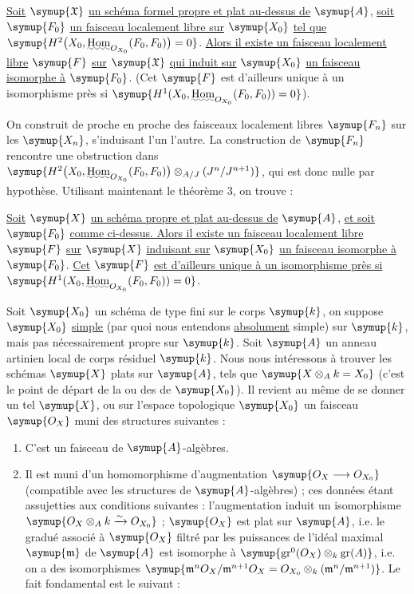  \uline{Soit} $\symup{\mathfrak X}$ \uline{un schéma formel propre et plat
au-dessus de} $\symup{A}$, \uline{soit} $\symup{F_0}$ \uline{un faisceau localement libre sur} $\symup{X_0}$ \uline{tel que}
$\symup{H^2\bigl(X_0,\mathop{\text{\uwave{Hom}}}\nolimits_{O_{X_0}}(F_0,F_0)\bigr)=0}$.
\uline{Alors il existe un faisceau localement libre} $\symup{F}$ \uline{sur} $\symup{\mathfrak X}$ \uline{qui induit
sur} $\symup{X_0}$ \uline{un faisceau isomorphe à} $\symup{F_0}$. (Cet $\symup{F}$ est d'ailleurs unique à un
isomorphisme près si
$\symup{H^1(X_0,\mathop{\text{\uwave{Hom}}}\nolimits_{O_{X_0}}(F_0,F_0))=0}$).

On construit de proche en proche des faisceaux localement libres $\symup{F_n}$ sur les
$\symup{X_n}$, s'induisant l'un l'autre. La construction de $\symup{F_n}$ rencontre une
obstruction dans
$\symup{H^2\bigl(X_0,\mathop{\text{\uwave{Hom}}}\nolimits_{O_{X_0}}(F_0,F_0)\bigr) \otimes_{A/J}(J^n/J^{n+1})}$,
qui est donc nulle par hypothèse. Utilisant maintenant le théorème 3, on
trouve :

 \uline{Soit} $\symup{X}$ \uline{un schéma propre et plat au-dessus de} $\symup{A}$, \uline{et
soit} $\symup{F_0}$ \uline{comme ci-dessus. Alors il existe un faisceau localement libre} $\symup{F}$
\uline{sur} $\symup{X}$ \uline{induisant sur} $\symup{X_0}$ \uline{un faisceau isomorphe à} $\symup{F_0}$. \uline{Cet} $\symup{F}$ \uline{est
d'ailleurs unique à un isomorphisme près si}
$\symup{H^1(X_0,\mathop{\text{\uwave{Hom}}}\nolimits_{O_{X_0}}(F_0,F_0))=0}$.

Soit $\symup{X_0}$ un schéma de type fini sur le corps $\symup{k}$, on suppose $\symup{X_0}$ \uline{simple}
(par quoi nous entendons \uline{absolument} simple) sur $\symup{k}$, mais pas nécessairement
propre sur $\symup{k}$. Soit $\symup{A}$ un anneau artinien local de corps résiduel $\symup{k}$. Nous
nous intéressons à trouver les schémas $\symup{X}$ plats sur $\symup{A}$, tels que
$\symup{X\otimes_A k=X_0}$ (c'est le point de départ de la  ou
des  de $\symup{X_0}$). Il revient au même de se donner un
tel $\symup{X}$, ou sur l'espace topologique $\symup{X_0}$ un faisceau $\symup{O_X}$ muni des
structures suivantes :
\begin{enumerate}
  \item[\textnormal{i.}] C'est un faisceau de $\symup{A}$-algèbres.
  \item[\textnormal{ii.}] Il est muni d'un homomorphisme d'augmentation
    $\symup{O_X\longrightarrow O_{X_0}}$ (compatible avec les structures de
    $\symup{A}$-algèbres) ; ces données étant assujetties aux conditions suivantes :
    l'augmentation induit un isomorphisme
    $\symup{O_X\otimes_A k\xrightarrow{\sim}O_{X_0}}$ ; $\symup{O_X}$ est plat sur
    $\symup{A}$, i.e. le gradué associé à $\symup{O_X}$ filtré par les puissances de l'idéal
    maximal $\symup{\mathfrak m}$ de $\symup{A}$ est isomorphe à
    $\symup{\operatorname{gr}^0(O_X)\otimes_k\operatorname{gr}(A)}$, i.e. on a des
    isomorphismes
    $\symup{\mathfrak m^nO_X/\mathfrak m^{n+1}O_X =O_{X_0}\otimes_k(\mathfrak m^n/\mathfrak m^{n+1})}$.
Le fait fondamental est le suivant :
\end{enumerate}

